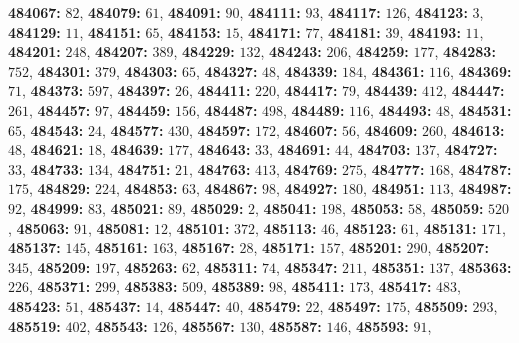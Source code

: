 \textsf{\bfseries 484067:} $82$, \textsf{\bfseries 484079:} $61$, \textsf{\bfseries 484091:} $90$, \textsf{\bfseries 484111:} $93$, \textsf{\bfseries 484117:} $126$, \textsf{\bfseries 484123:} $3$, \textsf{\bfseries 484129:} $11$, \textsf{\bfseries 484151:} $65$, \textsf{\bfseries 484153:} $15$, \textsf{\bfseries 484171:} $77$, \textsf{\bfseries 484181:} $39$, \textsf{\bfseries 484193:} $11$, \textsf{\bfseries 484201:} $248$, \textsf{\bfseries 484207:} $389$, \textsf{\bfseries 484229:} $132$, \textsf{\bfseries 484243:} $206$, \textsf{\bfseries 484259:} $177$, \textsf{\bfseries 484283:} $752$, \textsf{\bfseries 484301:} $379$, \textsf{\bfseries 484303:} $65$, \textsf{\bfseries 484327:} $48$, \textsf{\bfseries 484339:} $184$, \textsf{\bfseries 484361:} $116$, \textsf{\bfseries 484369:} $71$, \textsf{\bfseries 484373:} $597$, \textsf{\bfseries 484397:} $26$, \textsf{\bfseries 484411:} $220$, \textsf{\bfseries 484417:} $79$, \textsf{\bfseries 484439:} $412$, \textsf{\bfseries 484447:} $261$, \textsf{\bfseries 484457:} $97$, \textsf{\bfseries 484459:} $156$, \textsf{\bfseries 484487:} $498$, \textsf{\bfseries 484489:} $116$, \textsf{\bfseries 484493:} $48$, \textsf{\bfseries 484531:} $65$, \textsf{\bfseries 484543:} $24$, \textsf{\bfseries 484577:} $430$, \textsf{\bfseries 484597:} $172$, \textsf{\bfseries 484607:} $56$, \textsf{\bfseries 484609:} $260$, \textsf{\bfseries 484613:} $48$, \textsf{\bfseries 484621:} $18$, \textsf{\bfseries 484639:} $177$, \textsf{\bfseries 484643:} $33$, \textsf{\bfseries 484691:} $44$, \textsf{\bfseries 484703:} $137$, \textsf{\bfseries 484727:} $33$, \textsf{\bfseries 484733:} $134$, \textsf{\bfseries 484751:} $21$, \textsf{\bfseries 484763:} $413$, \textsf{\bfseries 484769:} $275$, \textsf{\bfseries 484777:} $168$, \textsf{\bfseries 484787:} $175$, \textsf{\bfseries 484829:} $224$, \textsf{\bfseries 484853:} $63$, \textsf{\bfseries 484867:} $98$, \textsf{\bfseries 484927:} $180$, \textsf{\bfseries 484951:} $113$, \textsf{\bfseries 484987:} $92$, \textsf{\bfseries 484999:} $83$, \textsf{\bfseries 485021:} $89$, \textsf{\bfseries 485029:} $2$, \textsf{\bfseries 485041:} $198$, \textsf{\bfseries 485053:} $58$, \textsf{\bfseries 485059:} $520$, \textsf{\bfseries 485063:} $91$, \textsf{\bfseries 485081:} $12$, \textsf{\bfseries 485101:} $372$, \textsf{\bfseries 485113:} $46$, \textsf{\bfseries 485123:} $61$, \textsf{\bfseries 485131:} $171$, \textsf{\bfseries 485137:} $145$, \textsf{\bfseries 485161:} $163$, \textsf{\bfseries 485167:} $28$, \textsf{\bfseries 485171:} $157$, \textsf{\bfseries 485201:} $290$, \textsf{\bfseries 485207:} $345$, \textsf{\bfseries 485209:} $197$, \textsf{\bfseries 485263:} $62$, \textsf{\bfseries 485311:} $74$, \textsf{\bfseries 485347:} $211$, \textsf{\bfseries 485351:} $137$, \textsf{\bfseries 485363:} $226$, \textsf{\bfseries 485371:} $299$, \textsf{\bfseries 485383:} $509$, \textsf{\bfseries 485389:} $98$, \textsf{\bfseries 485411:} $173$, \textsf{\bfseries 485417:} $483$, \textsf{\bfseries 485423:} $51$, \textsf{\bfseries 485437:} $14$, \textsf{\bfseries 485447:} $40$, \textsf{\bfseries 485479:} $22$, \textsf{\bfseries 485497:} $175$, \textsf{\bfseries 485509:} $293$, \textsf{\bfseries 485519:} $402$, \textsf{\bfseries 485543:} $126$, \textsf{\bfseries 485567:} $130$, \textsf{\bfseries 485587:} $146$, \textsf{\bfseries 485593:} $91$, 
